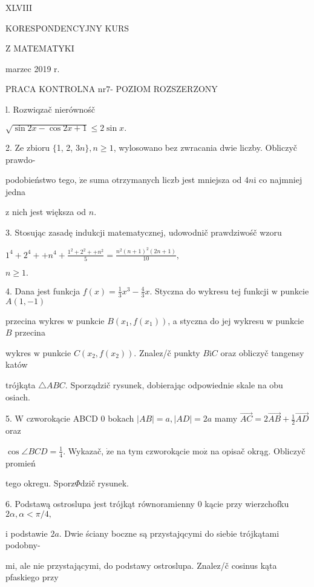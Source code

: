 \documentclass[a4paper,12pt]{article}
\begin{document}
XLVIII

KORESPONDENCYJNY KURS

Z MATEMATYKI

marzec 2019 r.

PRACA KONTROLNA $\mathrm{n}\mathrm{r} 7$- POZIOM ROZSZERZONY

l. Rozwiqzač nierównośč

$\sqrt{\sin 2x-\cos 2x+1}\leq 2\sin x.$

2. Ze zbioru $\{$1, 2, $3n\}, n\geq 1$, wylosowano bez zwracania dwie liczby. Obliczyč prawdo-

podobieństwo tego, $\dot{\mathrm{z}}\mathrm{e}$ suma otrzymanych liczb jest mniejsza od $4n\mathrm{i}$ co najmniej jedna

$\mathrm{z}$ nich jest większa od $n.$

3. Stosując zasadę indukcji matematycznej, udowodnič prawdziwośč wzoru

$1^{4}+2^{4}++n^{4}+\displaystyle \frac{1^{2}+2^{2}++n^{2}}{5}=\frac{n^{2}(n+1)^{2}(2n+1)}{10},$

$n\geq 1.$

4. Dana jest funkcja $f(x)=\displaystyle \frac{1}{3}x^{3}-\frac{4}{3}x$. Styczna do wykresu tej funkcji $\mathrm{w}$ punkcie $A(1,-1)$

przecina wykres $\mathrm{w}$ punkcie $B(x_{1},f(x_{1}))$, a styczna do jej wykresu $\mathrm{w}$ punkcie $B$ przecina

wykres $\mathrm{w}$ punkcie $C(x_{2},f(x_{2}))$. Znalez/č punkty $B \mathrm{i} C$ oraz obliczyč tangensy katów

trójkąta $\triangle ABC$. Sporządzič rysunek, dobierając odpowiednie skale na obu osiach.

5. $\mathrm{W}$ czworokącie ABCD $0$ bokach $|AB|=a, |AD|=2a$ mamy $\displaystyle \vec{AC}=2\vec{AB}+\frac{1}{2}\vec{AD}$ oraz

$\displaystyle \cos\angle BCD=\frac{1}{4}$. Wykazač, $\dot{\mathrm{z}}\mathrm{e}$ na tym czworokącie $\mathrm{m}\mathrm{o}\dot{\mathrm{z}}$ na opisač okrąg. Obliczyč promień

tego okregu. Sporz$\Phi$dzič rysunek.

6. Podstawą ostroslupa jest trójkąt równoramienny $0$ kącie przy wierzchofku $2\alpha, \alpha<\pi/4,$

$\mathrm{i}$ podstawie $2a$. Dwie ściany boczne są przystajqcymi do siebie trójkątami podobny-

mi, ale nie przystającymi, do podstawy ostroslupa. Znalez/č cosinus kąta pfaskiego przy
\end{document}
